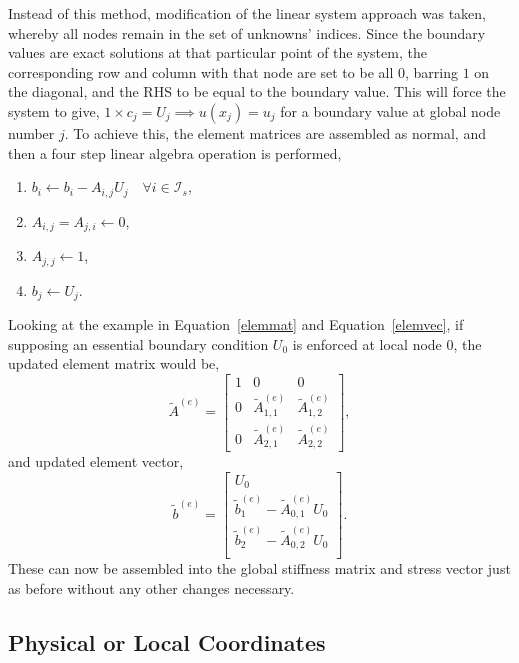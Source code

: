 Instead of this method, modification of the linear system approach was taken, whereby all nodes remain in the set of unknowns' indices. Since the boundary values are exact solutions at that particular point of the system, the corresponding row and column with that node are set to be all $0$, barring $1$ on the diagonal, and the RHS to be equal to the boundary value. This will force the system to give, $1 \times c_j = U_j \implies u(x_j) = u_j$ for a boundary value at global node number $j$. To achieve this, the element matrices are assembled as normal, and then a four step linear algebra operation is performed,
\begin{enumerate}
	\item $b_i \leftarrow b_i - A_{i,j}U_j\quad\forall i \in \mathcal{I}_s,$
	\item $A_{i,j} = A_{j,i} \leftarrow 0$,
	\item $A_{j,j} \leftarrow 1$,
	\item $b_j \leftarrow U_j$.
\end{enumerate}
Looking at the example in Equation~\ref{elemmat} and Equation~\ref{elemvec}, if supposing an essential boundary condition $U_0$ is enforced at local node $0$, the updated element matrix would be,
\begin{equation}
	\widetilde{A}^{(e)} =
	\left[\begin{matrix} 
		1 & 0 & 0 \\
		0 & \widetilde{A}^{(e)}_{1,1} & \widetilde{A}^{(e)}_{1,2} \\
		0 & \widetilde{A}^{(e)}_{2,1} & \widetilde{A}^{(e)}_{2,2}
	\end{matrix}\right],
\end{equation}
and updated element vector,
\begin{equation}
	\widetilde{b}^{(e)} =
	\left[\begin{matrix}
		U_0 \\
		\widetilde{b}^{(e)}_1 - \widetilde{A}^{(e)}_{0,1} U_0 \\
		\widetilde{b}^{(e)}_2 -\widetilde{A}^{(e)}_{0,2} U_0 \\
	\end{matrix}\right].
\end{equation}
These can now be assembled into the global stiffness matrix and stress vector just as before without any other changes necessary.
\cite{mardal}
\subsection{Physical or Local Coordinates}\label{coords}

